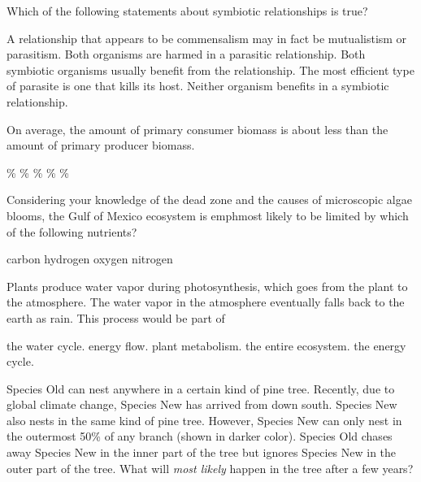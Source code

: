 \question
Which of the following statements about symbiotic relationships is true?

\begin{choices}
\correctchoice A relationship that appears to be commensalism may in fact be mutualistism or parasitism.%
\choice Both organisms are harmed in a parasitic relationship.%
\choice Both symbiotic organisms usually benefit from the relationship.%
\choice The most efficient type of parasite is one that kills its host.%
\choice Neither organism benefits in a symbiotic relationship.%
\end{choices}

\question
On average, the amount of primary consumer biomass is about \underline{\hspace{2cm}} less than the amount of primary producer biomass.

\begin{choices}
\%%
\%%
\%%
\%%
\%%
\end{choices}

\question
Considering your knowledge of the dead zone and the causes of microscopic algae blooms, the Gulf of Mexico ecosystem is emph{most likely} to be limited by which of the following nutrients?

\begin{choices}
\choice carbon%
\choice {}%
\choice hydrogen%
\choice oxygen%
\correctchoice nitrogen%
\end{choices}

\question
Plants produce water vapor during photosynthesis, which goes from the plant to the atmosphere. The water vapor in the atmosphere eventually falls back to the earth as rain. This process would be part of

\begin{choices}
\correctchoice the water cycle.%
\choice energy flow.%
\choice plant metabolism.%
\choice the entire ecosystem.%
\choice the energy cycle.%
\end{choices}


\question
Species Old can nest anywhere in a certain kind of pine tree. Recently, due to global climate change, Species New has arrived from down south. Species New also nests in the same kind of pine tree. However, Species New can only nest in the outermost 50\% of any branch (shown in darker color).  Species Old chases away Species New in the inner part of the tree but ignores Species New in the outer part of the tree. What will \emph{most likely} happen in the tree after a few years?

